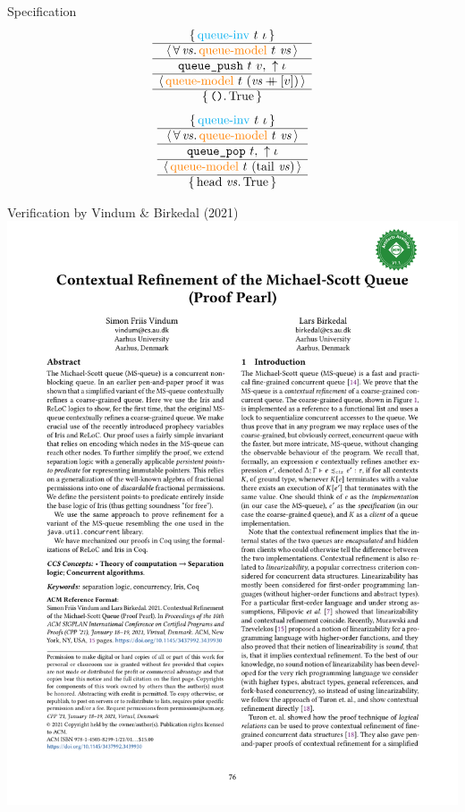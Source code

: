 
\begin{frame}{Specification}
\large
\[
  \aspec{
    \mathcolor{cyan}{\mathrm{queue \mathhyphen inv}}\ t\ \iota
  }{
    \mathit{vs}
  }{
    \mathcolor{orange}{\mathrm{queue \mathhyphen model}}\ t\ \mathit{vs}
  }{
    \texttt{queue\_push}\ t\ v,\ \uparrow \iota
  }{
    \mathcolor{orange}{\mathrm{queue \mathhyphen model}}\ t\ (\mathit{vs} \mdoubleplus [v])
  }{
    \texttt{()}
  }{
    \iTrue
  }
\]
\vfill
\[
  \aspec{
    \mathcolor{cyan}{\mathrm{queue \mathhyphen inv}}\ t\ \iota
  }{
    \mathit{vs}
  }{
    \mathcolor{orange}{\mathrm{queue \mathhyphen model}}\ t\ \mathit{vs}
  }{
    \texttt{queue\_pop}\ t,\ \uparrow \iota
  }{
    \mathcolor{orange}{\mathrm{queue \mathhyphen model}}\ t\ (\mathrm{tail}\ \mathit{vs})
  }{
    \mathrm{head}\ \mathit{vs}
  }{
    \iTrue
  }
\]
\end{frame}


\begin{frame}{Verification by Vindum \& Birkedal (2021)}
\centering
\includegraphics[scale=0.5]{images/vindum_birkedal_2021.pdf}
\end{frame}


